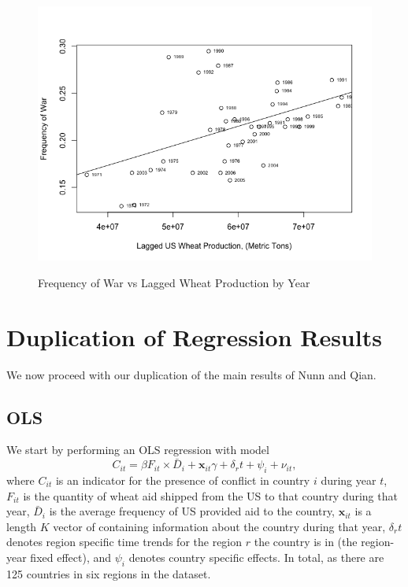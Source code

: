 \documentclass{article}
\newcommand{\x}{\mathbf x}
\begin{document}
\begin{figure}
\centering
\includegraphics[scale=0.5]{warvsWheatProd}
\label{warwheatprod}
\caption{Frequency of War vs Lagged Wheat Production by Year}
\end{figure}

\section{Duplication of Regression Results}
We now proceed with our duplication of the main results of Nunn and Qian. 
\subsection{OLS}
We start by performing an OLS regression with model
\[C_{it} = \beta F_{it} \times \bar D_{i} + \x_{it} \gamma +  \delta_r t + \psi_{i} + \nu_{it}, \]
where $C_{it}$ is an indicator for the presence of conflict in country $i$ during year $t$, $F_{it}$ is the quantity of wheat aid shipped from the US to that country during that year, $\bar D_{i}$ is the average frequency of US provided aid to the country, $\x_{it}$ is a length $K$ vector of containing information about the country during that year, $\delta_r t$ denotes region specific time trends for the region $r$ the country is in (the region-year fixed effect), and $\psi_{i}$ denotes country specific effects. In total, as there are 125 countries in six regions in the dataset.\\
\end{document}
